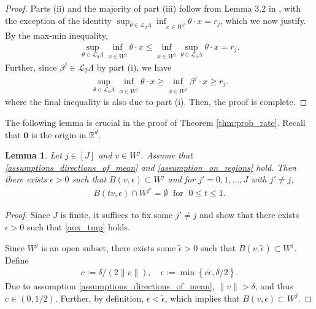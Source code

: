 \documentclass[aap,preprint]{imsart}
\newcommand{\bR}{{\mathbb{R}}}
\theoremstyle{plain}
\newtheorem{lemma}[theorem]{Lemma}
\theoremstyle{definition}
\begin{document}
\begin{appendix}
\begin{proof}
Parts (ii) and the majority of part (iii) follow from Lemma 3.2 in \cite{collamore2002}, with the exception of the identity
$\sup_{\theta \in \mathcal{L}_0 \Lambda} \inf_{x \in \overline{W^j}} \theta \cdot x = r_j$, 
which we now justify. By the max-min inequality,
\begin{align*}
    \sup_{\theta \in \mathcal{L}_0 \Lambda} \inf_{x \in \overline{W^j}} \theta \cdot x
\leq  \inf_{x \in \overline{W^j}} \sup_{\theta \in \mathcal{L}_0 \Lambda} \theta \cdot x  = r_j.
\end{align*}
Further, since $\beta^j \in \mathcal{L}_0 \Lambda$ by part (i), we have
\begin{align*}
  \sup_{\theta \in \mathcal{L}_0 \Lambda} \inf_{x \in \overline{W^j}} \theta \cdot x
\geq   \inf_{x \in \overline{W^j}} \beta^j \cdot x \geq r_j.
\end{align*}
where the final inequality is also due to part (i). Then, the proof is complete.
\end{proof}

The following lemma is crucial in the proof of Theorem \ref{thm:prob_rate}. Recall that $\textbf{0}$ is the origin in $\bR^d$.

\begin{lemma}\label{lemma:existence_epsilon_lower_bound}
Let $j \in [J]$ and $v \in W^j$. Assume that 
\eqref{assumptions_directions_of_mean} and   \eqref{assumption_on_regions} hold.  
Then there exists $\epsilon > 0$ such that $ B(v, \epsilon) \subset W^j$ and for $j' = 0,1,\ldots,J$ with $j' \neq j$,
\begin{align}
\label{aux_tmp}
B(tv, \epsilon)\cap W^{j'} = \emptyset\; \text{ for } \;0 \leq t \leq 1.
\end{align}
\end{lemma}
\begin{proof}
Since $J$ is finite, it suffices to fix some $j' \neq j$ and show that there exists $\epsilon > 0$ such that  \eqref{aux_tmp} holds.

Since $W^j$ is an open subset, there exists some $\tilde{\epsilon} >0$ such that $B(v,\tilde{\epsilon}) \subset W^j$. Define
\begin{align*}
    c  :=  \delta/ (2\|v\|), \quad  \epsilon :=  \min\left\{c \tilde{\epsilon}, \delta/2\right\}.
\end{align*}
Due to assumption \eqref{assumptions_directions_of_mean}, $\|v\| > \delta$, and thus $c \in (0,1/2)$. Further, by definition, $\epsilon < \tilde{\epsilon}$, which implies that $B(v,\epsilon) \subset W^j$.
  

\end{proof}
\end{appendix}
\end{document}
